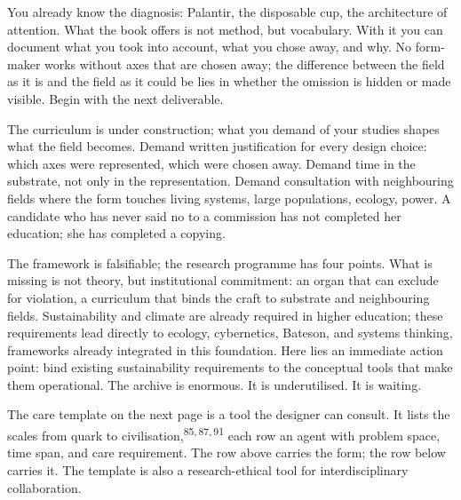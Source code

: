 \begin{widebody}
\begin{foreordbody}

\vspace{1mm}
\vspace{1mm}

You already know the diagnosis: Palantir, the disposable cup, the architecture of attention. What the book offers is not method, but vocabulary. With it you can document what you took into account, what you chose away, and why. No form-maker works without axes that are chosen away; the difference between the field as it is and the field as it could be lies in whether the omission is hidden or made visible. Begin with the next deliverable.

\vspace{3mm}
\vspace{1mm}

The curriculum is under construction; what you demand of your studies shapes what the field becomes. Demand written justification for every design choice: which axes were represented, which were chosen away. Demand time in the substrate, not only in the representation. Demand consultation with neighbouring fields where the form touches living systems, large populations, ecology, power. A candidate who has never said no to a commission has not completed her education; she has completed a copying.

\vspace{3mm}
\vspace{1mm}

The framework is falsifiable; the research programme has four points. What is missing is not theory, but institutional commitment: an organ that can exclude for violation, a curriculum that binds the craft to substrate and neighbouring fields. Sustainability and climate are already required in higher education; these requirements lead directly to ecology, cybernetics, Bateson, and systems thinking, frameworks already integrated in this foundation. Here lies an immediate action point: bind existing sustainability requirements to the conceptual tools that make them operational. The archive is enormous. It is underutilised. It is waiting.

\vspace{3mm}

The care template on the next page is a tool the designer can consult. It lists the scales from quark to civilisation,\textsuperscript{85,\,87,\,91} each row an agent with problem space, time span, and care requirement. The row above carries the form; the row below carries it. The template is also a research-ethical tool for interdisciplinary collaboration.

\end{foreordbody}
\end{widebody}
